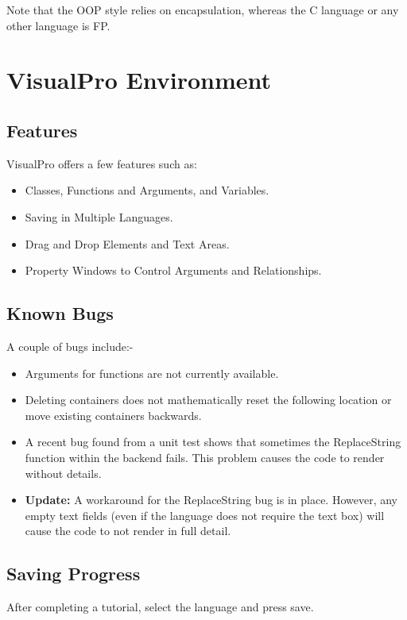 \documentclass[10pt]{article}
\begin{document}
    Note that the OOP style relies on encapsulation, whereas the C language or any other language is FP.

\newpage
\section{VisualPro Environment}
\label{sec:vp-env}
    \subsection{Features}
        VisualPro offers a few features such as:
        \begin{itemize}
            \item Classes, Functions and Arguments, and Variables.
            \item Saving in Multiple Languages.
            \item Drag and Drop Elements and Text Areas.
            \item Property Windows to Control Arguments and Relationships.
        \end{itemize}

    \subsection{Known Bugs}
        A couple of bugs include:-
        \begin{itemize}
            \item Arguments for functions are not currently available.
            \item Deleting containers does not mathematically reset the following location or move existing containers backwards.
            \item A recent bug found from a unit test shows that sometimes the ReplaceString function within the backend fails. This problem causes the code to render without details.
            \item \textbf{Update:} A workaround for the ReplaceString bug is in place. However, any empty text fields (even if the language does not require the text box) will cause the code to not render in full detail.
        \end{itemize}

    \subsection{Saving Progress}
        After completing a tutorial, select the language and press save.
\end{document}

